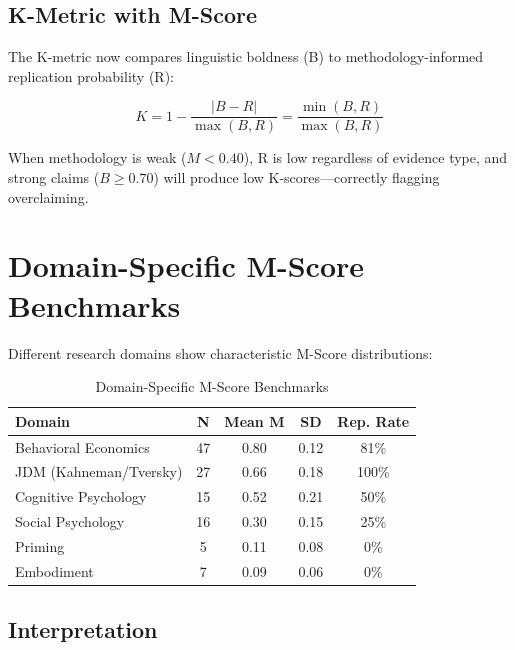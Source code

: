 \documentclass[11pt,a4paper]{article}
\begin{document}
\subsection{K-Metric with M-Score}

The K-metric now compares linguistic boldness (B) to methodology-informed replication probability (R):

\begin{equation}
K = 1 - \frac{|B - R|}{\max(B, R)} = \frac{\min(B, R)}{\max(B, R)}
\end{equation}

When methodology is weak ($M < 0.40$), R is low regardless of evidence type, and strong claims ($B \geq 0.70$) will produce low K-scores---correctly flagging overclaiming.


\section{Domain-Specific M-Score Benchmarks}
\label{sec:benchmarks}

Different research domains show characteristic M-Score distributions:

\begin{table}[h]
\centering
\caption{Domain-Specific M-Score Benchmarks}
\label{tab:benchmarks}
\begin{tabular}{lcccc}
\toprule
\textbf{Domain} & \textbf{N} & \textbf{Mean M} & \textbf{SD} & \textbf{Rep. Rate} \\
\midrule
Behavioral Economics & 47 & 0.80 & 0.12 & 81\% \\
JDM (Kahneman/Tversky) & 27 & 0.66 & 0.18 & 100\% \\
Cognitive Psychology & 15 & 0.52 & 0.21 & 50\% \\
Social Psychology & 16 & 0.30 & 0.15 & 25\% \\
Priming & 5 & 0.11 & 0.08 & 0\% \\
Embodiment & 7 & 0.09 & 0.06 & 0\% \\
\bottomrule
\end{tabular}
\end{table}

\subsection{Interpretation}
\end{document}
